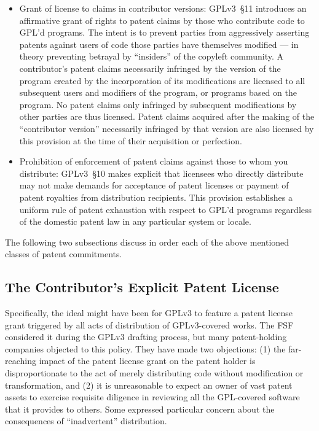 \begin{itemize}
\item Grant of license to claims in contributor versions: GPLv3~\S11
  introduces an affirmative grant of rights to patent claims by those who
  contribute code to GPL'd programs. The intent is to prevent parties from
  aggressively asserting patents against users of code those parties have
  themselves modified --- in theory preventing betrayal by ``insiders'' of
  the copyleft community.  A contributor's patent claims necessarily
  infringed by the version of the program created by the incorporation of its
  modifications are licensed to all subsequent users and modifiers of the
  program, or programs based on the program.  No patent claims only infringed
  by subsequent modifications by other parties are thus licensed.  Patent
  claims acquired after the making of the ``contributor version'' necessarily
  infringed by that version are also licensed by this provision at the time
  of their acquisition or perfection.

\item Prohibition of enforcement of patent claims against those to whom you
  distribute: GPLv3~\S10 makes explicit that licensees who directly
  distribute may not make demands for acceptance of patent licenses or
  payment of patent royalties from distribution recipients.  This provision
  establishes a uniform rule of patent exhaustion with respect to GPL'd
  programs regardless of the domestic patent law in any particular system or
  locale.
\end{itemize}

The following two subsections discuss in order each of the above mentioned
classes of patent commitments.

\subsection{The Contributor's Explicit Patent License}

Specifically, the ideal might have been for GPLv3 to feature a patent license
grant triggered by all acts of distribution of GPLv3-covered works.  The FSF
considered it during the GPLv3 drafting process, but many patent-holding
companies objected to this policy.  They have made two objections: (1) the
far-reaching impact of the patent license grant on the patent holder is
disproportionate to the act of merely distributing code without modification
or transformation, and (2) it is unreasonable to expect an owner of vast
patent assets to exercise requisite diligence in reviewing all the
GPL-covered software that it provides to others.  Some expressed particular
concern about the consequences of ``inadvertent'' distribution.

